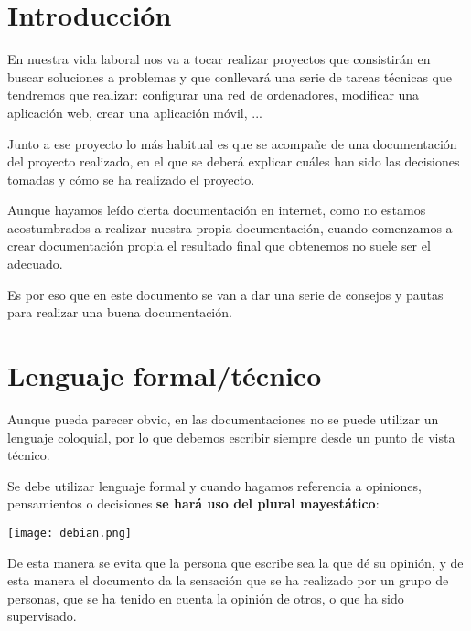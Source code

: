 \chapter{Introducción}

En nuestra vida laboral nos va a tocar realizar proyectos que consistirán en buscar soluciones a problemas y que conllevará una serie de tareas técnicas que tendremos que realizar: configurar una red de ordenadores, modificar una aplicación web, crear una aplicación móvil, ...

Junto a ese proyecto lo más habitual es que se acompañe de una documentación del proyecto realizado, en el que se deberá explicar cuáles han sido las decisiones tomadas y cómo se ha realizado el proyecto.

Aunque hayamos leído cierta documentación en internet, como no estamos acostumbrados a realizar nuestra propia documentación, cuando comenzamos a crear documentación propia el resultado final que obtenemos no suele ser el adecuado.

Es por eso que en este documento se van a dar una serie de consejos y pautas para realizar una buena documentación.


\chapter{Lenguaje formal/técnico}

\begin{minipage}{0.7\linewidth}
    \setlength{\parskip}{1.2em}
    \renewcommand{\baselinestretch}{1.4}
    Aunque pueda parecer obvio, en las documentaciones no se puede utilizar un lenguaje coloquial, por lo que debemos escribir siempre desde un punto de vista técnico.

    Se debe utilizar lenguaje formal y cuando hagamos referencia a opiniones, pensamientos o decisiones \textbf{se hará uso del plural mayestático}:
\end{minipage}
\hfill
\begin{minipage}{0.2\linewidth}
    \texttt{[image: debian.png]}
\end{minipage}





De esta manera se evita que la persona que escribe sea la que dé su opinión, y de esta manera el documento da la sensación que se ha realizado por un grupo de personas, que se ha tenido en cuenta la opinión de otros, o que ha sido supervisado.

